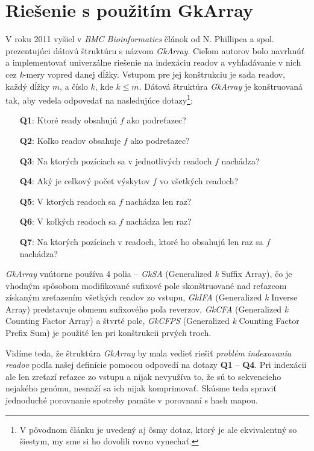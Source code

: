\section{Riešenie s použitím GkArray}
\label{sec:riesenie_s_pouzitim_gkarray}
V roku 2011 vyšiel v \emph{BMC Bioinformatics} článok od N. Phillipea a spol.\cite{NP11} prezentujúci dátovú štruktúru s názvom \emph{GkArray}. Cieľom autorov bolo navrhnúť a implementovať univerzálne riešenie na indexáciu readov a vyhľadávanie v nich cez \emph{k}-mery vopred danej dĺžky. Vstupom pre jej konštrukciu je sada readov, každý dĺžky $m$, a číslo $k$, kde $k \leq m$. Dátová štruktúra \emph{GkArray} je konštruovaná tak, aby vedela odpovedať na nasledujúce dotazy\footnote{V pôvodnom článku je uvedený aj ôsmy dotaz, ktorý je ale ekvivalentný so šiestym, my sme si ho dovolili rovno vynechať.}:

\begin{itemize}
    \item[\textbf{Q1}:]{Ktoré ready obsahujú $f$ ako podreťazec?}
    \item[\textbf{Q2}:]{Koľko readov obsahuje $f$ ako podreťazec?}
    \item[\textbf{Q3}:]{Na ktorých pozíciach sa v jednotlivých readoch $f$ nachádza?}
    \item[\textbf{Q4}:]{Aký je celkový počet výskytov $f$ vo všetkých readoch?}
    \item[\textbf{Q5}:]{V ktorých readoch sa $f$ nachádza len raz?}
    \item[\textbf{Q6}:]{V koľkých readoch sa $f$ nachádza len raz?}
    \item[\textbf{Q7}:]{Na ktorých pozíciach v readoch, ktoré ho obsahujú len raz sa $f$ nachádza?}
\end{itemize}

\emph{GkArray} vnútorne používa 4 polia -- \emph{GkSA} (Generalized \emph{k} Suffix Array), čo je vhodným spôsobom modifikované sufixové pole skonštruované nad reťazcom získaným zreťazením všetkých readov zo vstupu, \emph{GkIFA} (Generalized \emph{k} Inverse Array) predstavuje obmenu sufixového poľa reverzov, \emph{GkCFA} (Generalized \emph{k} Counting Factor Array) a štvrté pole, \emph{GkCFPS} (Generalized \emph{k} Counting Factor Prefix Sum) je použité len pri konštrukcii prvých troch.

Vidíme teda, že štruktúra \emph{GkArray} by mala vedieť riešiť \emph{problém indexovania readov} podľa našej definície pomocou odpovedí na dotazy \textbf{Q1} -- \textbf{Q4}. Pri indexácii ale len zreťazí reťazce zo vstupu a nijak nevyužíva to, že sú to sekvencieho nejakého genómu, nesnaží sa ich nijak komprimovať. Skúsme teda spraviť jednoduché porovnanie spotreby pamäte v porovnaní s hash mapou.

